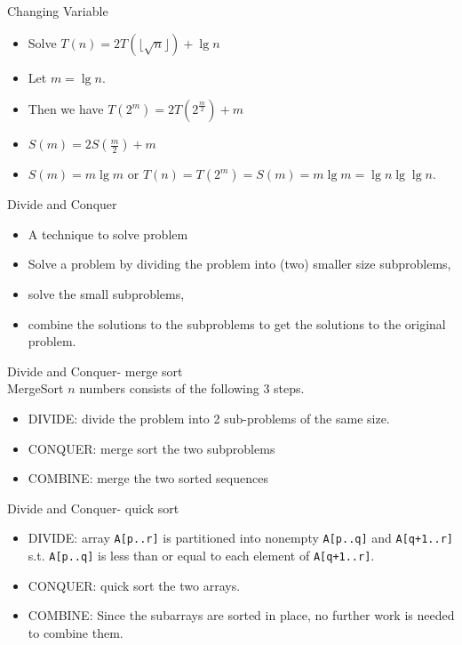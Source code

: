 \documentclass{beamer}
\begin{document}
\begin{frame}{}
\begin{center}
{\large Changing Variable}
\end{center}
\begin{itemize}
\item Solve $T(n)=2T(\lfloor \sqrt{n}\rfloor) +\lg n$
\item Let $m=\lg n$.
\item Then we have $T(2^m) = 2 T(2^{\frac{m}{2}})+m$
\item $S(m)=2 S(\frac{m}{2})+m$
\item $S(m)=m\lg m$ or $T(n)=T(2^m)=S(m)=m\lg m = \lg n\lg \lg n$.
\end{itemize}
\end{frame}

\begin{frame}{}
\begin{center}
{\large Divide and Conquer}
\end{center}
\begin{itemize}
\item A technique to solve problem
\item Solve a problem by dividing the problem into (two) smaller size subproblems,
\item solve the small subproblems, 
\item combine the solutions to the subproblems to get the solutions to the 
  original problem.  
\end{itemize}
\end{frame}

\begin{frame}{}
\begin{center}
{\large Divide and Conquer- merge sort}\\
{\large MergeSort $n$ numbers consists of the following 3 steps.}
\end{center}
\begin{itemize}
\item DIVIDE: divide the problem into 2 sub-problems of the same size.
\item CONQUER: merge sort the two subproblems
\item COMBINE: merge the two sorted sequences
\end{itemize}
\end{frame}

\begin{frame}{}
\begin{center}
{\large Divide and Conquer- quick sort}
\end{center}
\begin{itemize}
\item DIVIDE: array {\tt A[p..r]} is partitioned into nonempty
      {\tt A[p..q]} and {\tt A[q+1..r]} s.t. {\tt A[p..q]} is less than 
      or equal to each element of {\tt A[q+1..r]}.
\item CONQUER: quick sort the two arrays.
\item COMBINE: Since the subarrays are sorted in place, no further work
 is needed to combine them.  
\end{itemize}
\end{frame}
\end{document}
